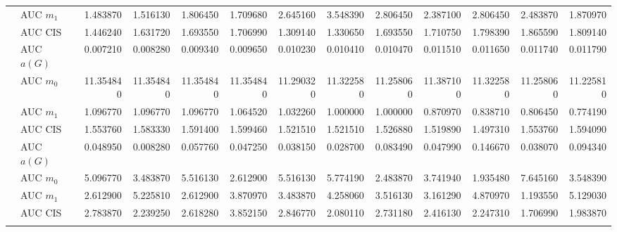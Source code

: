 \begin{table}[htbp]
\begin{tabular}{llrrrrrrrrrrr}
    & AUC $m_1$ & 1.483870 & 1.516130 & 1.806450 & 1.709680 & 2.645160 & 3.548390 & 2.806450 & 2.387100 & 2.806450 & 2.483870 & 1.870970 \\
    & AUC CIS & 1.446240 & 1.631720 & 1.693550 & 1.706990 & 1.309140 & 1.330650 & 1.693550 & 1.710750 & 1.798390 & 1.865590 & 1.809140 \\
    \addlinespace
    \multirow{4}{*}{degree} & AUC $a(G)$ & 0.007210 & 0.008280 & 0.009340 & 0.009650 & 0.010230 & 0.010410 & 0.010470 & 0.011510 & 0.011650 & 0.011740 & 0.011790 \\
    & AUC $m_0$ & 11.354840 & 11.354840 & 11.354840 & 11.354840 & 11.290320 & 11.322580 & 11.258060 & 11.387100 & 11.322580 & 11.258060 & 11.225810 \\
    & AUC $m_1$ & 1.096770 & 1.096770 & 1.096770 & 1.064520 & 1.032260 & 1.000000 & 1.000000 & 0.870970 & 0.838710 & 0.806450 & 0.774190 \\
    & AUC CIS & 1.553760 & 1.583330 & 1.591400 & 1.599460 & 1.521510 & 1.521510 & 1.526880 & 1.519890 & 1.497310 & 1.553760 & 1.594090 \\
    \addlinespace
    \multirow{4}{*}{random} & AUC $a(G)$ & 0.048950 & 0.008280 & 0.057760 & 0.047250 & 0.038150 & 0.028700 & 0.083490 & 0.047990 & 0.146670 & 0.038070 & 0.094340 \\
    & AUC $m_0$ & 5.096770 & 3.483870 & 5.516130 & 2.612900 & 5.516130 & 5.774190 & 2.483870 & 3.741940 & 1.935480 & 7.645160 & 3.548390 \\
    & AUC $m_1$ & 2.612900 & 5.225810 & 2.612900 & 3.870970 & 3.483870 & 4.258060 & 3.516130 & 3.161290 & 4.870970 & 1.193550 & 5.129030 \\
    & AUC CIS & 2.783870 & 2.239250 & 2.618280 & 3.852150 & 2.846770 & 2.080110 & 2.731180 & 2.416130 & 2.247310 & 1.706990 & 1.983870 \\
    \addlinespace
    \bottomrule
  \end{tabular}
\end{table}


